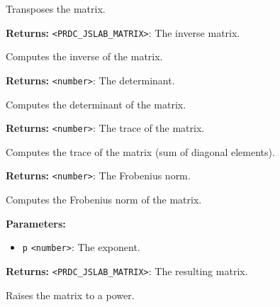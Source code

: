 \documentclass[12pt,a4paper]{article}
\begin{document}
\noindent Transposes the matrix.

\vspace{5mm}
\noindent {}


\noindent \textbf{Returns:} \texttt{<PRDC\_JSLAB\_MATRIX>}: The inverse matrix.

\noindent Computes the inverse of the matrix.

\vspace{5mm}
\noindent {}


\noindent \textbf{Returns:} \texttt{<number>}: The determinant.

\noindent Computes the determinant of the matrix.

\vspace{5mm}
\noindent {}


\noindent \textbf{Returns:} \texttt{<number>}: The trace of the matrix.

\noindent Computes the trace of the matrix (sum of diagonal elements).

\vspace{5mm}
\noindent {}


\noindent \textbf{Returns:} \texttt{<number>}: The Frobenius norm.

\noindent Computes the Frobenius norm of the matrix.

\vspace{5mm}
\noindent {}


\noindent \textbf{Parameters:}
\begin{itemize}
  \item \texttt{p} \texttt{<number>}: The exponent.
\end{itemize}

\noindent \textbf{Returns:} \texttt{<PRDC\_JSLAB\_MATRIX>}: The resulting matrix.

\noindent Raises the matrix to a power.
\end{document}
